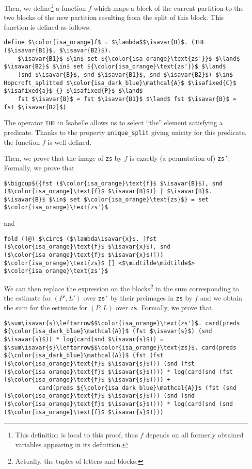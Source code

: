 \documentclass[12pt, a4 paper]{article}
\newcommand{\midtilde}{\raisebox{0.5ex}{\texttildelow}}
\newcommand{\isavar}[1]{{\color{isa_dark_green}\text{#1}}}
\newcommand{\isafixed}[1]{{\color{isa_dark_blue}\text{#1}}}
\theoremstyle{definition}
\begin{document}
Then, we define\footnote{This definition is local to this proof, thus $f$ depends on all formerly obtained variables appearing in its definition.} a function $f$ which maps a block of the current partition to the two blocks of the new partition resulting from the split of this block. This function is defined as follows:

\begin{lstlisting}[language=Isabelle]
define $\color{isa_orange}f$ = $\lambda$$\isavar{B}$. (THE ($\isavar{B1}$, $\isavar{B2}$).
    $\isavar{B1}$ $\in$ set ${\color{isa_orange}\text{zs'}}$ $\land$ $\isavar{B2}$ $\in$ set ${\color{isa_orange}\text{zs'}}$ $\land$
    (snd $\isavar{B}$, snd $\isavar{B1}$, snd $\isavar{B2}$) $\in$ Hopcroft_splitted $\color{isa_dark_blue}\mathcal{A}$ $\isafixed{C}$ $\isafixed{a}$ {} $\isafixed{P}$ $\land$
    fst $\isavar{B}$ = fst $\isavar{B1}$ $\land$ fst $\isavar{B}$ = fst $\isavar{B2}$)
\end{lstlisting}
The operator {\color{isa_blue}\texttt{THE}} in Isabelle allows us to select ``the'' element satisfying a predicate. Thanks to the property \texttt{unique\_split} giving unicity for this predicate, the function $f$ is well-defined.

Then, we prove that the image of \texttt{zs} by $f$ is exactly (a permutation of) \texttt{zs'}. Formally, we prove that
\begin{lstlisting}[language=Isabelle]
$\bigcup${{fst ($\color{isa_orange}\text{f}$ $\isavar{B}$), snd ($\color{isa_orange}\text{f}$ $\isavar{B}$)} | $\isavar{B}$. $\isavar{B}$ $\in$ set $\color{isa_orange}\text{zs}$} = set $\color{isa_orange}\text{zs'}$
\end{lstlisting}
and
\begin{lstlisting}[language=Isabelle]
fold ((@) $\circ$ ($\lambda\isavar{x}$. [fst ($\color{isa_orange}\text{f}$ $\isavar{x}$), snd ($\color{isa_orange}\text{f}$ $\isavar{x}$)])) $\color{isa_orange}\text{zs}$ [] <$\midtilde\midtilde$> $\color{isa_orange}\text{zs'}$
\end{lstlisting}

\bigskip

We can then replace the expression on the blocks\footnote{Actually, the tuples of letters and blocks.} in the sum corresponding to the estimate for $(P', L')$ over \texttt{zs'} by their preimages in \texttt{zs} by $f$ and we obtain the sum for the estimate for $(P, L)$ over \texttt{zs}.
Formally, we prove that
\begin{lstlisting}[language=Isabelle]
$\sum\isavar{s}\leftarrow$$\color{isa_orange}\text{zs'}$. card(preds ${\color{isa_dark_blue}\mathcal{A}}$ (fst $\isavar{s}$) (snd $\isavar{s}$)) * log(card(snd $\isavar{s}$)) =
$\sum\isavar{s}\leftarrow$$\color{isa_orange}\text{zs}$. card(preds ${\color{isa_dark_blue}\mathcal{A}}$ (fst (fst ($\color{isa_orange}\text{f}$ $\isavar{s}$))) (snd (fst ($\color{isa_orange}\text{f}$ $\isavar{s}$)))) * log(card(snd (fst ($\color{isa_orange}\text{f}$ $\isavar{s}$)))) +
          card(preds ${\color{isa_dark_blue}\mathcal{A}}$ (fst (snd ($\color{isa_orange}\text{f}$ $\isavar{s}$))) (snd (snd ($\color{isa_orange}\text{f}$ $\isavar{s}$)))) * log(card(snd (snd ($\color{isa_orange}\text{f}$ $\isavar{s}$))))
\end{lstlisting}
\end{document}
